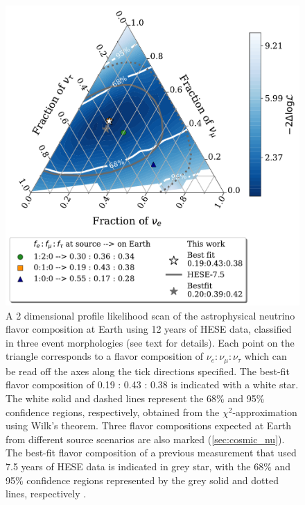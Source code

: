 \begin{figure}
    
    \includegraphics{./figures/results/HESE12_fancy_coverage_say_withhese7.pdf}
    \caption{A 2 dimensional profile likelihood scan of the astrophysical neutrino flavor composition at Earth using 12 years of HESE data, classified in three event morphologies (see text for details). Each point on the triangle corresponds to a flavor composition of $\nu_e : \nu_{\mu} : \nu_{\tau}$ which can be read off the axes along the tick directions specified. The best-fit flavor composition of 0.19 : 0.43 : 0.38 is indicated with a white star. The white solid and dashed lines represent the 68\% and 95\% confidence regions, respectively, obtained from the $\chi^2$-approximation using Wilk's theorem. Three flavor compositions expected at Earth from different source scenarios are also marked (\ref{sec:cosmic_nu}). The best-fit flavor composition of a previous measurement that used 7.5 years of HESE data is indicated in grey star, with the 68\% and 95\% confidence regions represented by the grey solid and dotted lines, respectively \cite{Juliana_paper}.}

\end{figure}

